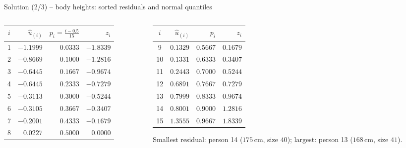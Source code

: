 \documentclass[aspectratio=169,11pt]{beamer}
\begin{document}
\begin{frame}{Solution (2/3) -- body heights: sorted residuals and normal quantiles}
  \begin{columns}[T]
    \begin{column}{0.49\textwidth}
      \begin{center}
        \small
        \renewcommand{\arraystretch}{1.05}
        \begin{tabular}{c r r r}
          \toprule
          $i$ & $\hat{u}_{(i)}$ & $p_i=\frac{i-0.5}{15}$ & $z_i$ \\
          \midrule
          1 & $-1.1999$ & $0.0333$ & $-1.8339$ \\
          2 & $-0.8669$ & $0.1000$ & $-1.2816$ \\
          3 & $-0.6445$ & $0.1667$ & $-0.9674$ \\
          4 & $-0.6445$ & $0.2333$ & $-0.7279$ \\
          5 & $-0.3113$ & $0.3000$ & $-0.5244$ \\
          6 & $-0.3105$ & $0.3667$ & $-0.3407$ \\
          7 & $-0.2001$ & $0.4333$ & $-0.1679$ \\
          8 & $0.0227$  & $0.5000$ & $0.0000$ \\
          \bottomrule
        \end{tabular}
      \end{center}
    \end{column}
    \begin{column}{0.49\textwidth}
      \begin{center}
        \small
        \renewcommand{\arraystretch}{1.05}
        \begin{tabular}{c r r r}
          \toprule
          $i$ & $\hat{u}_{(i)}$ & $p_i$ & $z_i$ \\
          \midrule
          9  & $0.1329$ & $0.5667$ & $0.1679$ \\
          10 & $0.1331$ & $0.6333$ & $0.3407$ \\
          11 & $0.2443$ & $0.7000$ & $0.5244$ \\
          12 & $0.6891$ & $0.7667$ & $0.7279$ \\
          13 & $0.7999$ & $0.8333$ & $0.9674$ \\
          14 & $0.8001$ & $0.9000$ & $1.2816$ \\
          15 & $1.3555$ & $0.9667$ & $1.8339$ \\
          \bottomrule
        \end{tabular}
      \end{center}
      \footnotesize Smallest residual: person 14 ($175$\,cm, size $40$);
      largest: person 13 ($168$\,cm, size $41$).
    \end{column}
  \end{columns}
\end{frame}
\end{document}
